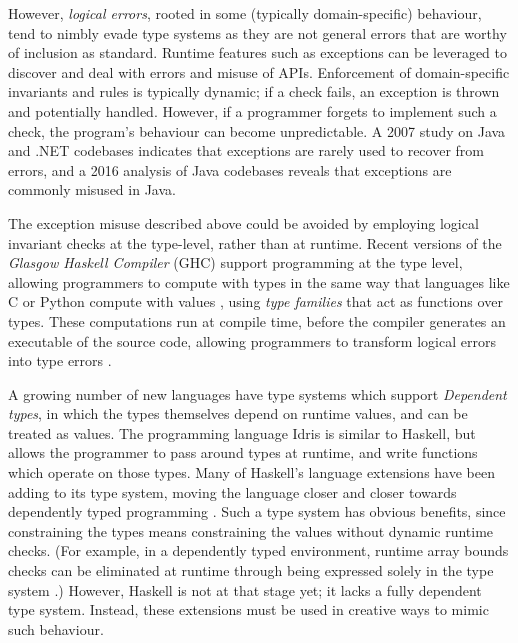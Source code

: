 However, \emph{logical errors}, rooted in some (typically domain-specific) behaviour, tend to nimbly evade type systems as they are not general errors that are worthy of inclusion as standard. Runtime features such as exceptions can be leveraged to discover and deal with errors and misuse of APIs. Enforcement of domain-specific invariants and rules is typically dynamic; if a check fails, an exception is thrown and potentially handled. However, if a programmer forgets to implement such a check, the program's behaviour can become unpredictable. A 2007 study \cite{exceptionsusedpoorly} on Java and .NET codebases indicates that exceptions are rarely used to recover from errors, and a 2016 analysis of Java codebases \cite{badjavaexceptions} reveals that exceptions are commonly misused in Java.

The exception misuse described above could be avoided by employing logical invariant checks at the type-level, rather than at runtime. Recent versions of the \emph{Glasgow Haskell Compiler} (GHC) support programming at the type level, allowing programmers to compute with types in the same way that languages like C or Python compute with values \cite{givingpromotion}, using \emph{type families} \cite{opentfs,closedtfs} that act as functions over types. These computations run at compile time, before the compiler generates an executable of the source code, allowing programmers to transform logical errors into type errors \cite{twt}.

A growing number of new languages have type systems which support \emph{Dependent types}, in which the types themselves depend on runtime values, and can be treated as values. The programming language Idris is similar to Haskell, but allows the programmer to pass around types at runtime, and write functions which operate on those types. Many of Haskell's language extensions have been adding to its type system, moving the language closer and closer towards dependently typed programming \cite{singletons}. Such a type system has obvious benefits, since constraining the types means constraining the values without dynamic runtime checks. (For example, in a dependently typed environment, runtime array bounds checks can be eliminated at runtime through being expressed solely in the type system \cite{dependentarray}.) However, Haskell is not at that stage yet; it lacks a fully dependent type system. Instead, these extensions must be used in creative ways to mimic such behaviour.

